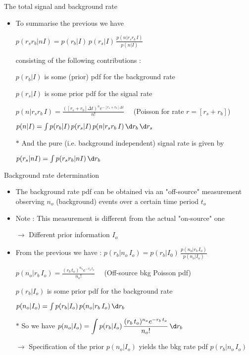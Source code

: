 \onecolumn
\begin{center}
{\red The total signal and background rate}
\end{center}
%
\begin{itemize}
\item To summarise the previous we have
\item[] \begin{center}{\blue $\displaystyle p(r_{s}r_{b}|nI)=p(r_{b}|I)\,p(r_{s}|I)\,\frac{p(n|r_{s}r_{b}\,I)}{p(n|I)}$}\end{center}
\item[] consisting of the following contributions :
\item[] $p(r_{b}|I)$ is some (prior) pdf for the background rate
\item[] $p(r_{s}|I)$ is some prior pdf for the signal rate
\item[] $\displaystyle p(n|r_{s}r_{b}\,I)=\frac{([r_{s}+r_{b}]\Delta t)^{n} e^{-[r_{s}+r_{b}]\Delta t}}{n!} \quad$
        (Poisson for rate $r=[r_{s}+r_{b}]$)
\item[] $p(n|I)=\int p(r_{b}|I)\,p(r_{s}|I)\,p(n|r_{s}r_{b}\,I)\,\d r_{b}\,\d r_{s}$
\item[$\ast$] And the pure (i.e. background independent) signal rate is given by 
\item[] \begin{center}{\blue $p(r_{s}|nI)=\int p(r_{s}r_{b}|nI)\,\d r_{b}$}\end{center}
\end{itemize}

\Tr
\begin{center}
{\red Background rate determination} 
\end{center}
%
\begin{itemize}
\item The background rate pdf can be obtained via an "off-source" measurement\\
      observing $n_{o}$ (background) events over a certain time period $t_{o}$
\item Note : This measurement is different from the actual "on-source" one
\item[] $\rightarrow$ Different prior information $I_{o}$
\item From the previous we have :
        {\blue $\displaystyle p(r_{b}|n_{o}\,I_{o})=p(r_{b}|I_{0})\,\frac{p(n_{o}|r_{b}\,I_{o})}{p(n_{o}|I_{o})}$}
\item[] {\blue $\displaystyle p(n_{o}|r_{b}\,I_{o})=\frac{(r_{b}\,t_{o})^{n_{o}} e^{-r_{b}\,t_{o}}}{n_{o}!} \quad$}
        (Off-source bkg Poisson pdf)
\item[] $p(r_{b}|I_{o})$ is some prior pdf for the background rate
\item[] $p(n_{o}|I_{o})=\int p(r_{b}|I_{o})\,p(n_{o}|r_{b}\,I_{o})\,\d r_{b}$
\item[$\ast$] So we have {\blue $\displaystyle p(n_{o}|I_{o})=\int p(r_{b}|I_{o})\,
        \frac{(r_{b}\,t_{o})^{n_{o}} e^{-r_{b}\,t_{o}}}{n_{o}!}\,\d r_{b}$}
\item[] $\rightarrow$ Specification of the prior $p(n_{o}|I_{o})$ yields the bkg rate pdf $p(r_{b}|n_{o}\,I_{o})$
\end{itemize}

